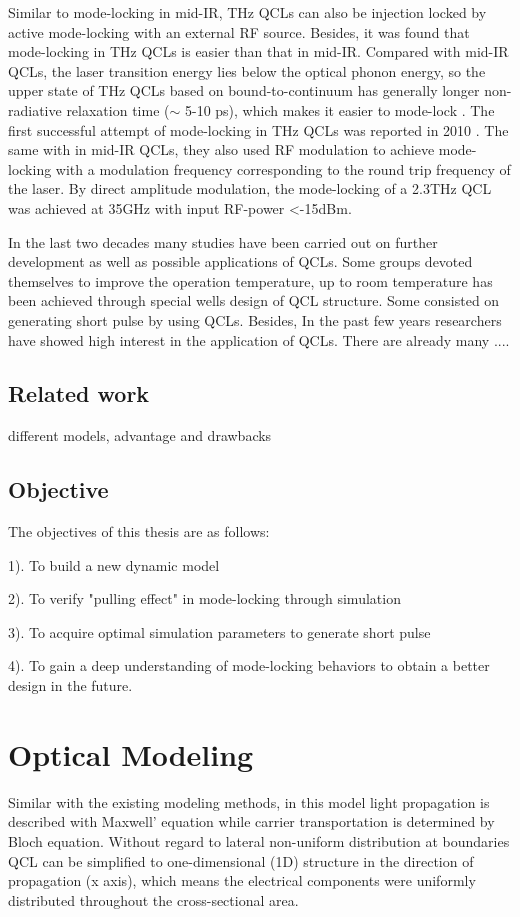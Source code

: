 \documentclass[11pt,final]{scrbook}
\begin{document}
Similar to mode-locking in mid-IR, THz QCLs can also be injection locked by active mode-locking with an external RF source. Besides, it was found that mode-locking in THz QCLs is easier than that in mid-IR. Compared with mid-IR QCLs, the laser transition energy lies below the optical phonon energy, so the upper state of THz QCLs based on bound-to-continuum has generally longer non-radiative relaxation time ($\sim$ 5-10 ps), which makes it easier to mode-lock \cite{barbieri2011coherent}. The first successful attempt of mode-locking in THz QCLs was reported in 2010 \cite{gellie2010injection}. The same with in mid-IR QCLs, they also used RF modulation to achieve mode-locking with a modulation frequency corresponding to the round trip frequency of the laser. By direct amplitude modulation, the mode-locking of a 2.3THz QCL was achieved at 35GHz with input RF-power <-15dBm.

In the last two decades many studies have been carried out on further development as well as possible applications of QCLs. Some groups devoted themselves to improve the operation temperature, up to room temperature has been achieved\cite{bai2011room} through special wells design of QCL structure. Some consisted on generating short pulse by using QCLs\cite{wang2009mode}. Besides, In the past few years researchers have showed high interest in the application of QCLs. There are already many 
....


\section{Related work}
different models, advantage and drawbacks

\section{Objective}
The objectives of this thesis are as follows:

1). To build a new dynamic model 

2). To verify "pulling effect" in mode-locking through simulation

3). To acquire optimal simulation parameters to generate short pulse

4). To gain a deep understanding of mode-locking behaviors to obtain a better design in the future.

\chapter{Optical Modeling}
Similar with the existing modeling methods, in this model light propagation is described with Maxwell' equation while carrier transportation is determined by Bloch equation. Without regard to lateral non-uniform distribution at boundaries \cite{huang2014non, dhar2015nanoscopic} QCL can be simplified to one-dimensional (1D) structure in the direction of propagation (x axis), which means the electrical components were uniformly distributed throughout the cross-sectional area. 
\end{document}
